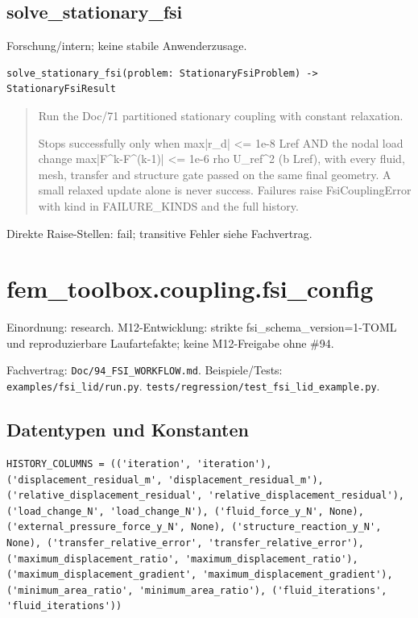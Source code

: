 \subsection{solve\_stationary\_fsi}
Forschung/intern; keine stabile Anwenderzusage.
\begin{lstlisting}
solve_stationary_fsi(problem: StationaryFsiProblem) -> StationaryFsiResult
\end{lstlisting}
\begin{quote}
Run the Doc/71 partitioned stationary coupling with constant relaxation.\par Stops successfully only when max|r\_d| <= 1e-8 Lref AND the nodal load change max|F\textasciicircum{}k-F\textasciicircum{}(k-1)| <= 1e-6 rho U\_ref\textasciicircum{}2 (b Lref), with every fluid, mesh, transfer and structure gate passed on the same final geometry. A small relaxed update alone is never success. Failures raise FsiCouplingError with kind in FAILURE\_KINDS and the full history.
\end{quote}
Direkte Raise-Stellen: fail; transitive Fehler siehe Fachvertrag.
\section{fem\_toolbox.coupling.fsi\_config}
Einordnung: research. M12-Entwicklung: strikte fsi\_schema\_version=1-TOML und reproduzierbare Laufartefakte; keine M12-Freigabe ohne \#94.
\par Fachvertrag: \nolinkurl{Doc/94_FSI_WORKFLOW.md}. Beispiele/Tests:
\nolinkurl{examples/fsi_lid/run.py}.
\nolinkurl{tests/regression/test_fsi_lid_example.py}.
\subsection*{Datentypen und Konstanten}
\begin{lstlisting}
HISTORY_COLUMNS = (('iteration', 'iteration'), ('displacement_residual_m', 'displacement_residual_m'), ('relative_displacement_residual', 'relative_displacement_residual'), ('load_change_N', 'load_change_N'), ('fluid_force_y_N', None), ('external_pressure_force_y_N', None), ('structure_reaction_y_N', None), ('transfer_relative_error', 'transfer_relative_error'), ('maximum_displacement_ratio', 'maximum_displacement_ratio'), ('maximum_displacement_gradient', 'maximum_displacement_gradient'), ('minimum_area_ratio', 'minimum_area_ratio'), ('fluid_iterations', 'fluid_iterations'))
\end{lstlisting}
